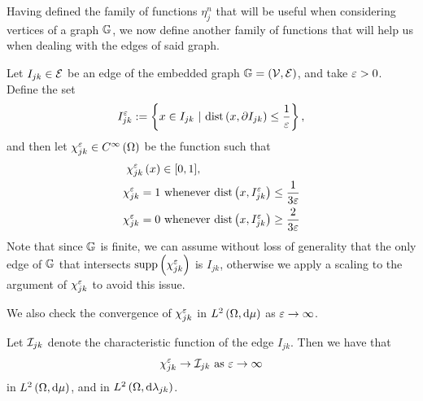 Having defined the family of functions $\eta_j^n$ that will be useful when considering vertices of a graph $\mathbb{G}$, we now define another family of functions that will help us when dealing with the edges of said graph.
\begin{definition} \label{def:ChiDef}
	Let $I_{jk}\in \mathcal{E}$ be an edge of the embedded graph $\mathbb{G}=\left( \mathcal{V},\mathcal{E} \right)$, and take $\varepsilon>0$.
	Define the set 
	\begin{align} \label{eq:ShortenedIntervalDef}
		I_{jk}^{\eps} := \clbracs{ x\in I_{jk} \ \vert \ \mathrm{dist}\bracs{x, \partial I_{jk}}\leq \recip{\eps}},
	\end{align}
	and then let $\chi_{jk}^\varepsilon\in C^{\infty}\left( \Omega \right)$ be the function such that 
	\begin{align*}
		\chi_{jk}^\varepsilon\left( x \right) &\in [0,1], \\
		\chi_{jk}^\varepsilon = 1 &\text{ whenever } \mathrm{dist}\left( x, I_{jk}^\varepsilon \right)\leq \frac{1}{3\varepsilon} \\
		\chi_{jk}^\varepsilon = 0 &\text{ whenever } \mathrm{dist}\left( x, I_{jk}^\varepsilon \right)\geq \frac{2}{3\varepsilon}
\end{align*}
	Note that since $\mathbb{G}$ is finite, we can assume without loss of generality that the only edge of $\mathbb{G}$ that intersects $\mathrm{supp}\left( \chi_{jk}^\varepsilon \right)$ is $I_{jk}$, otherwise we apply a scaling to the argument of $\chi_{jk}^\varepsilon$ to avoid this issue.
\end{definition}
We also check the convergence of $\chi_{jk}^\varepsilon$ in $L^{2}\left( \Omega,\mathrm{d}\mu \right)$ as $\varepsilon\rightarrow\infty$.
\begin{lemma} \label{lem:ChiConv}
	Let $\mathcal{I}_{jk}$ denote the characteristic function of the edge $I_{jk}$.
	Then we have that 
	\begin{align*}
		\chi_{jk}^\varepsilon \rightarrow \mathcal{I}_{jk} \ \text{as} \ \varepsilon \rightarrow\infty
	\end{align*}
	in $L^{2}\left( \Omega,\mathrm{d}\mu \right)$, and in $L^{2}\left( \Omega,\mathrm{d}\lambda_{jk} \right)$.
\end{lemma}
